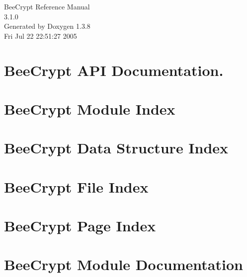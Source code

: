 \documentclass[a4paper]{book}
\begin{document}
\begin{titlepage}
\vspace*{7cm}
\begin{center}
{\Large Bee\-Crypt Reference Manual\\[1ex]\large 3.1.0 }\\
\vspace*{1cm}
{\large Generated by Doxygen 1.3.8}\\
\vspace*{0.5cm}
{\small Fri Jul 22 22:51:27 2005}\\
\end{center}
\end{titlepage}
\clearemptydoublepage
{}
\tableofcontents
\clearemptydoublepage
{}
\chapter{Bee\-Crypt API Documentation. }
\label{index}\hypertarget{index}{}
\chapter{Bee\-Crypt Module Index}

\chapter{Bee\-Crypt Data Structure Index}

\chapter{Bee\-Crypt File Index}

\chapter{Bee\-Crypt Page Index}

\chapter{Bee\-Crypt Module Documentation}






























\end{document}
